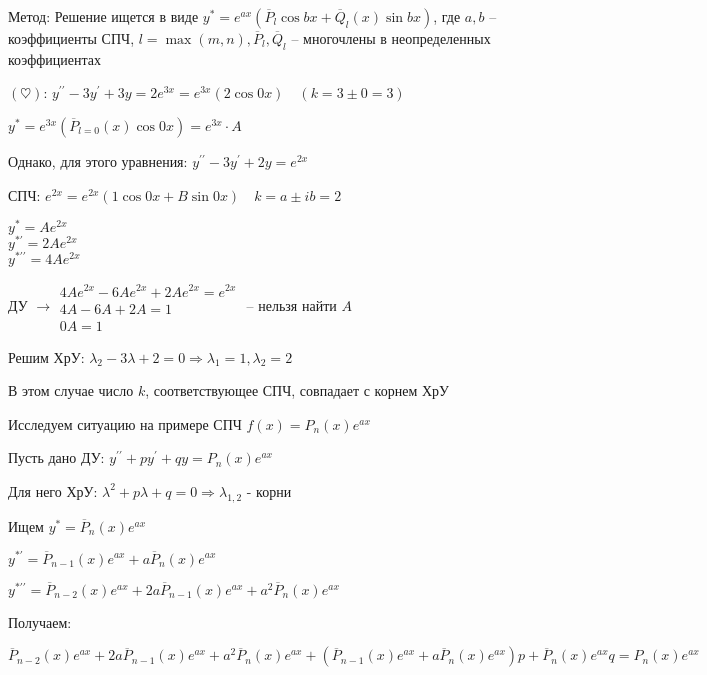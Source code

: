 \documentclass[12pt]{article}
\begin{document}
    Метод: Решение ищется в виде $y^* = e^{ax} (\overline{P}_l \cos bx + \overline{Q}_l (x) \sin bx)$,
    где $a, b$ -- коэффициенты СПЧ, $l = \max(m, n), \overline{P}_l, \overline{Q}_l$ -- многочлены в неопределенных коэффициентах

     $(\heartsuit)$: $y^{\prime\prime} - 3y^\prime + 3y = 2e^{3x} = e^{3x} (2 \cos 0x) \quad (k = 3 \pm 0 = 3)$

    $y^* = e^{3x} (\overline{P}_{l = 0} (x) \cos 0x) = e^{3x} \cdot A$

     Однако, для этого уравнения: $y^{\prime\prime} - 3y^\prime + 2y = e^{2x}$

    СПЧ: $e^{2x} = e^{2x} (1 \cos 0x + B \sin 0x) \quad k = a \pm ib = 2$

    \begin{rcases*}
    $y^* = Ae^{2x}$ \\
    $y^{*\prime} = 2Ae^{2x}$ \\
    $y^{*\prime\prime} = 4Ae^{2x}$ \\
    \end{rcases*} ДУ $\longrightarrow \begin{matrix}4Ae^{2x} - 6Ae^{2x} + 2Ae^{2x} = e^{2x} \\ 4A - 6A + 2A = 1 \\ 0A = 1\end{matrix}$ -- нельзя найти $A$ {\Huge 🤯}

    Решим ХрУ: $\lambda_2 - 3\lambda + 2 = 0 \Longrightarrow \lambda_1 = 1, \lambda_2 = 2$

    В этом случае число $k$, соответствующее СПЧ, совпадает с корнем ХрУ

    \smallvspace

    Исследуем ситуацию на примере СПЧ $f(x) = P_n(x) e^{ax}$

    Пусть дано ДУ: $y^{\prime\prime} + py^\prime + qy = P_n(x)e^{ax}$

    Для него ХрУ: $\lambda^2 + p\lambda + q = 0 \Longrightarrow \lambda_{1,2}$ - корни

    Ищем $y^* = \overline{P}_n(x) e^{ax}$

    $y^{*\prime} = \overline{P}_{n - 1} (x) e^{ax} + a\overline{P}_n(x) e^{ax}$

    $y^{*\prime\prime} = \overline{P}_{n - 2} (x) e^{ax} + 2a\overline{P}_{n - 1} (x) e^{ax} + a^2\overline{P}_n(x) e^{ax}$

    Получаем:

    $\overline{P}_{n - 2} (x) e^{ax} + 2a\overline{P}_{n - 1} (x) e^{ax} + a^2\overline{P}_n(x) e^{ax} + (\overline{P}_{n - 1} (x) e^{ax} + a\overline{P}_n(x) e^{ax})p + \overline{P}_n(x) e^{ax} q = P_n(x) e^{ax}$
\end{document}
